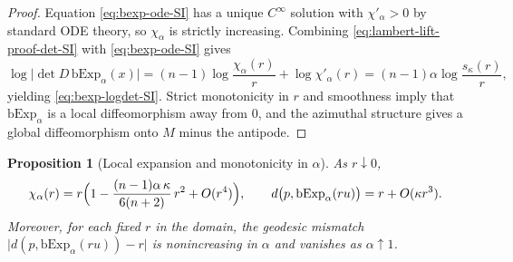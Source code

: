 \documentclass{article}
\newtheorem{proposition}{Proposition}
\theoremstyle{definition}
\theoremstyle{remark}
\begin{document}
\begin{proof}
Equation \eqref{eq:bexp-ode-SI} has a unique $C^\infty$ solution with $\chi'_\alpha>0$ by standard ODE
theory, so $\chi_\alpha$ is strictly increasing. Combining \eqref{eq:lambert-lift-proof-det-SI} with
\eqref{eq:bexp-ode-SI} gives
\[
\log\bigl|\det D\,\mathrm{bExp}_\alpha(x)\bigr|
=(n-1)\log\frac{\chi_\alpha(r)}{r}+\log\chi'_\alpha(r)
=(n-1)\alpha\log\frac{s_\kappa(r)}{r},
\]
yielding \eqref{eq:bexp-logdet-SI}. Strict monotonicity in $r$ and smoothness imply that
$\mathrm{bExp}_\alpha$ is a local diffeomorphism away from $0$, and the azimuthal structure gives a
global diffeomorphism onto $M$ minus the antipode.
\end{proof}

\begin{proposition}[Local expansion and monotonicity in $\alpha$]
As $r\downarrow0$,
\[
\chi_\alpha(r)
=
r\Bigl(1-\frac{(n-1)\alpha\,\kappa}{6(n+2)}\,r^2+O(r^4)\Bigr),
\qquad
d\bigl(p,\mathrm{bExp}_\alpha(ru)\bigr)
=
r+O(\kappa r^3).
\]
Moreover, for each fixed $r$ in the domain, the geodesic mismatch
$\bigl|d(p,\mathrm{bExp}_\alpha(ru))-r\bigr|$ is nonincreasing in $\alpha$ and vanishes as $\alpha\uparrow1$.
\end{proposition}
\end{document}
